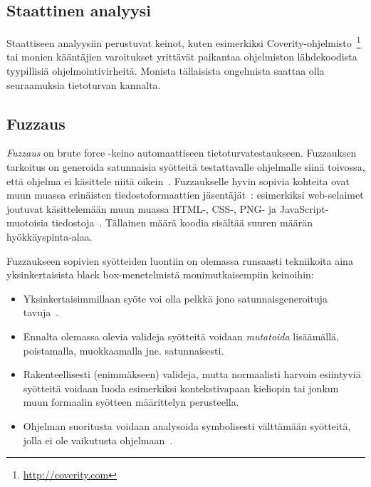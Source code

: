 \subsection{Staattinen analyysi}

Staattiseen analyysiin perustuvat keinot,
kuten esimerkiksi Coverity-ohjelmisto~\footnote{\url{http://coverity.com}} tai monien kääntäjien varoitukset yrittävät paikantaa ohjelmiston lähdekoodista tyypillisiä ohjelmointivirheitä.
Monista tällaisista ongelmista saattaa olla seuraamuksia tietoturvan kannalta. \fixme[lähde?]

\subsection{Fuzzaus}

\emph{Fuzzaus} on brute force -keino automaattiseen tietoturvatestaukseen.
Fuzzauksen tarkoitus on generoida satunnaisia syötteitä testattavalle ohjelmalle siinä toivossa,
että ohjelma ei käsittele niitä oikein~\cite{UnixReliability}. 
Fuzzaukselle hyvin sopivia kohteita ovat muun muassa erinäisten tiedostoformaattien jäsentäjät~\cite{SageArtikkeli,OuluBrowser}:
esimerkiksi web-selaimet joutuvat käsittelemään muun muassa HTML-, CSS-, PNG- ja JavaScript-muotoisia tiedostoja~\cite{OuluBrowser}. Tällainen määrä koodia sisältää suuren määrän hyökkäyspinta-alaa.

Fuzzaukseen sopivien syötteiden luontiin on olemassa runsaasti tekniikoita aina yksinkertaisista black box-menetelmistä monimutkaisempiin keinoihin:
\begin{itemize}
    \item Yksinkertaisimmillaan syöte voi olla pelkkä jono satunnaisgeneroituja tavuja~\cite{UnixReliability}. \fixme[esimerkki]
    \item Ennalta olemassa olevia valideja syötteitä voidaan \emph{mutatoida} lisäämällä, poistamalla, muokkaamalla jne. satunnaisesti.
    \item Rakenteellisesti (enimmäkseen) valideja, mutta normaalisti harvoin esiintyviä syötteitä voidaan luoda esimerkiksi kontekstivapaan kieliopin tai jonkun muun formaalin syötteen määrittelyn perusteella.
    \item Ohjelman suoritusta voidaan analysoida symbolisesti välttämään syötteitä, jolla ei ole vaikutusta ohjelmaan~\cite{SageArtikkeli}.
\end{itemize}



